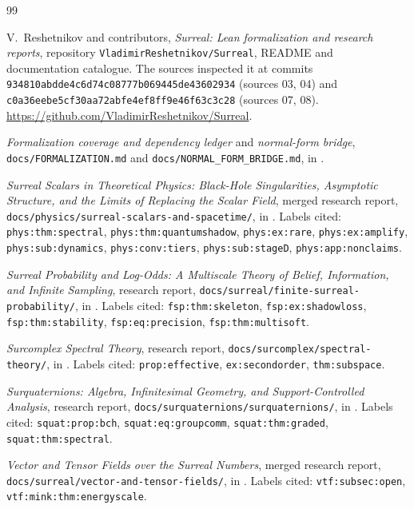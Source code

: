 \documentclass[11pt,oneside]{article}
\numberwithin{equation}{section}
\theoremstyle{plain}
\theoremstyle{definition}
\theoremstyle{remark}
\newcommand{\repo}{\texttt{VladimirReshetnikov/Surreal}}
\begin{document}
\clearpage
\begin{thebibliography}{99}
\small\raggedright

V.~Reshetnikov and contributors, \emph{Surreal: Lean formalization and research reports}, repository \repo, README and documentation catalogue. The sources inspected it at commits \texttt{934810abdde4c6d74c08777b069445de43602934} (sources 03, 04) and \texttt{c0a36eebe5cf30aa72abfe4ef8ff9e46f63c3c28} (sources 07, 08). \url{https://github.com/VladimirReshetnikov/Surreal}.

\emph{Formalization coverage and dependency ledger} and \emph{normal-form bridge}, \texttt{docs/FORMALIZATION.md} and \texttt{docs/NORMAL\_FORM\_BRIDGE.md}, in \cite{repo}.

\emph{Surreal Scalars in Theoretical Physics: Black-Hole Singularities, Asymptotic Structure, and the Limits of Replacing the Scalar Field}, merged research report, \texttt{docs/physics/surreal-scalars-and-spacetime/}, in \cite{repo}. Labels cited: \texttt{phys:thm:spectral}, \texttt{phys:thm:quantumshadow}, \texttt{phys:ex:rare}, \texttt{phys:ex:amplify}, \texttt{phys:sub:dynamics}, \texttt{phys:conv:tiers}, \texttt{phys:sub:stageD}, \texttt{phys:app:nonclaims}.

\emph{Surreal Probability and Log-Odds: A Multiscale Theory of Belief, Information, and Infinite Sampling}, research report, \texttt{docs/surreal/finite-surreal-probability/}, in \cite{repo}. Labels cited: \texttt{fsp:thm:skeleton}, \texttt{fsp:ex:shadowloss}, \texttt{fsp:thm:stability}, \texttt{fsp:eq:precision}, \texttt{fsp:thm:multisoft}.

\emph{Surcomplex Spectral Theory}, research report, \texttt{docs/surcomplex/spectral-theory/}, in \cite{repo}. Labels cited: \texttt{prop:effective}, \texttt{ex:secondorder}, \texttt{thm:subspace}.

\emph{Surquaternions: Algebra, Infinitesimal Geometry, and Support-Controlled Analysis}, research report, \texttt{docs/surquaternions/surquaternions/}, in \cite{repo}. Labels cited: \texttt{squat:prop:bch}, \texttt{squat:eq:groupcomm}, \texttt{squat:thm:graded}, \texttt{squat:thm:spectral}.

\emph{Vector and Tensor Fields over the Surreal Numbers}, merged research report, \texttt{docs/surreal/vector-and-tensor-fields/}, in \cite{repo}. Labels cited: \texttt{vtf:subsec:open}, \texttt{vtf:mink:thm:energyscale}.


\end{thebibliography}
\end{document}
